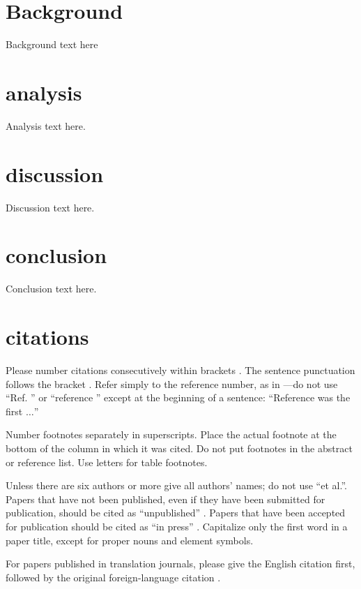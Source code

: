 \documentclass[conference]{IEEEtran}
\begin{document}
\section{Background}

Background text here

\section{analysis}

Analysis text here.


\section*{discussion}

Discussion text here.

\section{conclusion}

Conclusion text here.

\section*{citations}

Please number citations consecutively within brackets \cite{b1}. The 
sentence punctuation follows the bracket \cite{b2}. Refer simply to the reference 
number, as in \cite{b3}---do not use ``Ref. \cite{b3}'' or ``reference \cite{b3}'' except at 
the beginning of a sentence: ``Reference \cite{b3} was the first $\ldots$''

Number footnotes separately in superscripts. Place the actual footnote at 
the bottom of the column in which it was cited. Do not put footnotes in the 
abstract or reference list. Use letters for table footnotes.

Unless there are six authors or more give all authors' names; do not use 
``et al.''. Papers that have not been published, even if they have been 
submitted for publication, should be cited as ``unpublished'' \cite{b4}. Papers 
that have been accepted for publication should be cited as ``in press'' \cite{b5}. 
Capitalize only the first word in a paper title, except for proper nouns and 
element symbols.

For papers published in translation journals, please give the English 
citation first, followed by the original foreign-language citation \cite{b6}.
\end{document}
